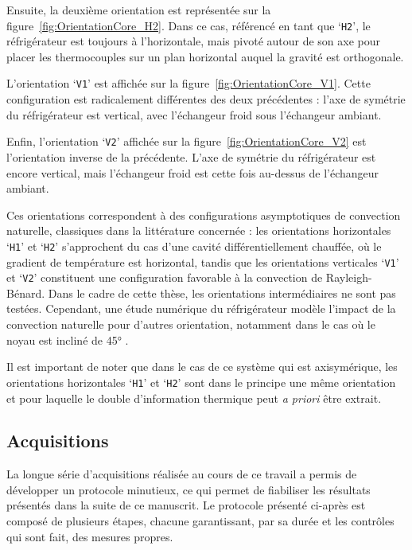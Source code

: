 Ensuite, la deuxième orientation est représentée sur la figure~\ref{fig:OrientationCore_H2}. Dans ce cas, référencé en tant que `\texttt{H2}', le réfrigérateur est toujours à l'horizontale, mais pivoté autour de son axe pour placer les thermocouples sur un plan horizontal auquel la gravité est orthogonale.\smallskip

L'orientation `\texttt{V1}' est affichée sur la figure~\ref{fig:OrientationCore_V1}. Cette configuration est radicalement différentes des deux précédentes : l'axe de symétrie du réfrigérateur est vertical, avec l'échangeur froid sous l'échangeur ambiant.\smallskip

Enfin, l'orientation `\texttt{V2}' affichée sur la figure~\ref{fig:OrientationCore_V2} est l'orientation inverse de la précédente. L'axe de symétrie du réfrigérateur est encore vertical, mais l'échangeur froid est cette fois au-dessus de l'échangeur ambiant.\medskip

Ces orientations correspondent à des configurations asymptotiques de convection naturelle, classiques dans la littérature concernée : les orientations horizontales `\texttt{H1}' et `\texttt{H2}' s'approchent du cas d'une cavité différentiellement chauffée, où le gradient de température est horizontal, tandis que les orientations verticales `\texttt{V1}' et `\texttt{V2}' constituent une configuration favorable à la convection de Rayleigh-Bénard. Dans le cadre de cette thèse, les orientations intermédiaires ne sont pas testées. Cependant, une étude numérique du réfrigérateur modèle l'impact de la convection naturelle pour d'autres orientation, notamment dans le cas où le noyau est incliné de \ang{45} \cite{baltean_gravity_2025}.\bigskip

Il est important de noter que dans le cas de ce système qui est axisymérique, les orientations horizontales `\texttt{H1}' et `\texttt{H2}' sont dans le principe une même orientation et pour laquelle le double d'information thermique peut \textit{a priori} être extrait.\medskip




\subsection{Acquisitions}\label{chap:Acquisitions}
La longue série d'acquisitions réalisée au cours de ce travail a permis de développer un protocole minutieux, ce qui permet de fiabiliser les résultats présentés dans la suite de ce manuscrit. Le protocole présenté ci-après est composé de plusieurs étapes, chacune garantissant, par sa durée et les contrôles qui sont fait, des mesures propres. 

